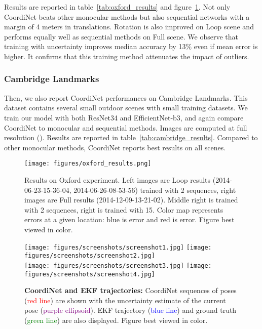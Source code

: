 \documentclass[10pt,twocolumn,letterpaper]{article}
\begin{document}
Results are reported in table~\ref{tab:oxford_results} and figure~\ref{oxford_trajs}. Not only CoordiNet beats other monocular methods but also sequential networks with a margin of 4 meters in translations. Rotation is also improved on Loop scene and performs equally well as sequential methods on Full scene. We observe that training with uncertainty improves median accuracy by 13\% even if mean error is higher. It confirms that this training method attenuates the impact of outliers.

\subsubsection{Cambridge Landmarks}

Then, we also report CoordiNet performances on Cambridge Landmarks. This dataset contains several small outdoor scenes with small training datasets. We train our model with both ResNet34 and EfficientNet-b3, and again compare CoordiNet to monocular and sequential methods. Images are computed at full resolution (). Results are reported in table~\ref{tab:cambridge_results}. Compared to other monocular methods, CoordiNet reports best results on all scenes.

\begin{figure}[!b]
   \texttt{[image: figures/oxford\_results.png]}
   \caption{Results on Oxford experiment. Left images are Loop results (2014-06-23-15-36-04, 2014-06-26-08-53-56) trained with 2 sequences, right images are Full results (2014-12-09-13-21-02). Middle right is trained with 2 sequences, right is trained with 15. Color map represents errors at a given location: blue is  error and red is  error. Figure best viewed in color.}\label{oxford_trajs}
\end{figure}

\begin{figure*}[!b]
\centering
\texttt{[image: figures/screenshots/screenshot1.jpg]}
\texttt{[image: figures/screenshots/screenshot2.jpg]} \\
\vspace{1mm}
\texttt{[image: figures/screenshots/screenshot3.jpg]}
\texttt{[image: figures/screenshots/screenshot4.jpg]}
   \caption{\textbf{CoordiNet and EKF trajectories:} CoordiNet sequences of poses (\textcolor{red}{red line}) are shown with the uncertainty estimate of the current pose (\textcolor{purple}{purple ellipsoid}). EKF trajectory (\textcolor{blue}{blue line}) and ground truth (\textcolor{green}{green line}) are also displayed. Figure best viewed in color.}\label{screenshots}
\end{figure*}
\end{document}
